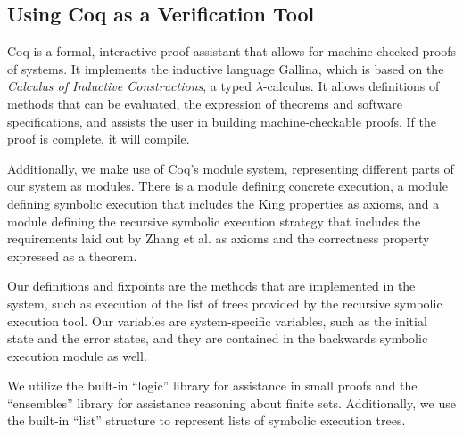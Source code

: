 \subsection{Using Coq as a Verification Tool}

Coq is a formal, interactive proof assistant that allows for machine-checked proofs of systems. 
It implements the inductive language Gallina, which is based on the \textit{Calculus of Inductive Constructions}, a typed $\lambda$-calculus. It allows definitions of methods that can be evaluated, the expression of theorems and software specifications, and assists the user in building machine-checkable proofs. If the proof is complete, it will compile.



 

Additionally, we make use of Coq's module system, representing different parts of our system as modules.  There is a module defining concrete execution, a module defining symbolic execution that includes the King properties as axioms, and a module defining the recursive symbolic execution strategy that includes the requirements laid out by Zhang et al. as axioms and the correctness property expressed as a theorem.

Our definitions and fixpoints are the methods that are implemented
in the system, such as execution of the list of trees provided by the recursive
symbolic execution tool. Our variables are system-specific variables, such as the
initial state and the error states, and they are contained in the backwards symbolic execution module as well.

We utilize the built-in ``logic'' library for assistance in small proofs and the ``ensembles'' library for assistance reasoning about finite sets. Additionally, we use the built-in ``list'' structure to represent lists of symbolic execution trees.









